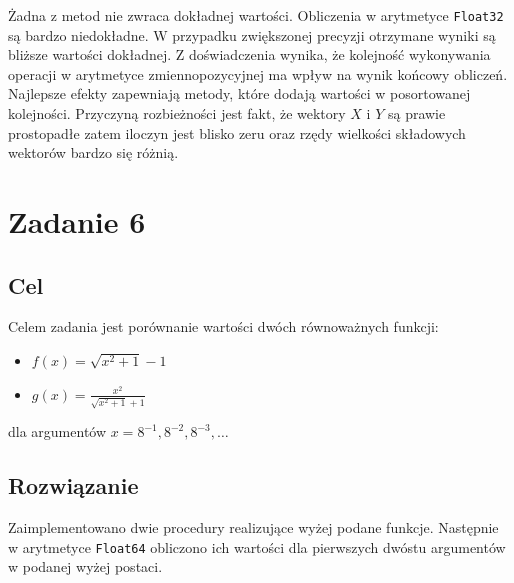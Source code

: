 \documentclass{article}
\begin{document}
Żadna z metod nie zwraca dokładnej wartości. Obliczenia w arytmetyce \texttt{Float32} są bardzo niedokładne. \newline W przypadku zwiększonej precyzji otrzymane wyniki są bliższe wartości dokładnej. Z doświadczenia wynika, że kolejność wykonywania operacji w arytmetyce zmiennopozycyjnej ma wpływ na wynik końcowy obliczeń. Najlepsze efekty zapewniają metody, które dodają wartości w posortowanej kolejności. \newline
Przyczyną rozbieżności jest fakt, że wektory $X$ i $Y$ są prawie prostopadłe zatem iloczyn jest blisko zeru oraz rzędy wielkości składowych wektorów bardzo się różnią. 

\section{Zadanie 6}
\subsection{Cel}
Celem zadania jest porównanie wartości dwóch równoważnych funkcji:
\begin{itemize}
    \item $f(x) = \sqrt{x^2 + 1} - 1$
    \item $g(x) = \frac{x^2}{\sqrt{x^2 + 1} + 1}$
\end{itemize}
dla argumentów $x = 8^{-1}, 8^{-2}, 8^{-3}, \dots$

\subsection{Rozwiązanie}
Zaimplementowano dwie procedury realizujące wyżej podane funkcje. Następnie w arytmetyce \texttt{Float64} obliczono ich wartości dla pierwszych dwóstu argumentów w podanej wyżej postaci.
\end{document}
